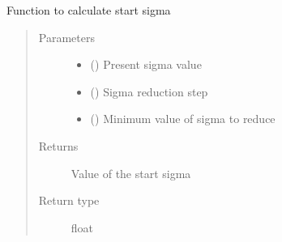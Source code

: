 \documentclass[letterpaper,10pt,english]{sphinxmanual}
\begin{document}
\begin{fulllineitems}
\begin{fulllineitems}
\label{\detokenize{paircars:paircars.intensity_selfcal_LTS.IntensitySelfcal.change_start_sigma}}
\sphinxAtStartPar
Function to calculate start sigma
\begin{quote}\begin{description}
\item[{Parameters}] \leavevmode\begin{itemize}
\item {} 
\sphinxAtStartPar
{} () \textendash{} Present sigma value

\item {} 
\sphinxAtStartPar
{} () \textendash{} Sigma reduction step

\item {} 
\sphinxAtStartPar
{} () \textendash{} Minimum value of sigma to reduce

\end{itemize}

\item[{Returns}] \leavevmode
\sphinxAtStartPar
Value of the start sigma

\item[{Return type}] \leavevmode
\sphinxAtStartPar
float

\end{description}\end{quote}

\end{fulllineitems}



\end{fulllineitems}
\end{document}

